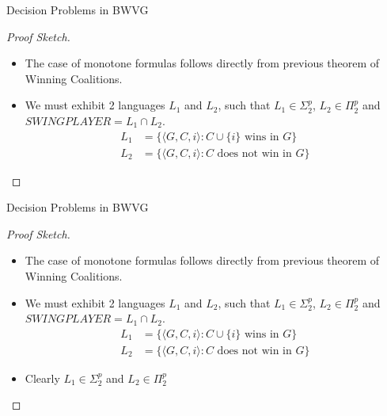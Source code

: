 \documentclass{beamer}
\begin{document}
\begin{frame}[fragile]{Decision Problems in BWVG}
  \begin{proof}[Proof Sketch]
    \begin{itemize}
      \item The case of monotone formulas follows directly from previous theorem of Winning Coalitions.
      \item We must exhibit 2 languages $L_1$ and $L_2$, such that $L_1 \in \Sigma_2^p$, $L_2 \in \Pi_2^p$ and $SWINGPLAYER = L_1 \cap L_2$.
      \begin{subequations}
        \begin{align}
          L_1 &= \{ \langle G, C, i \rangle : C \cup \{i\} \text{ wins in } G \}\\
          L_2 &= \{ \langle G, C, i \rangle : C \text{ does not win in } G \}
        \end{align}
      \end{subequations}
    \end{itemize}
  \end{proof}
\end{frame}

\begin{frame}[fragile]{Decision Problems in BWVG}
  \begin{proof}[Proof Sketch]
    \begin{itemize}
      \item The case of monotone formulas follows directly from previous theorem of Winning Coalitions.
      \item We must exhibit 2 languages $L_1$ and $L_2$, such that $L_1 \in \Sigma_2^p$, $L_2 \in \Pi_2^p$ and $SWINGPLAYER = L_1 \cap L_2$.
      \begin{subequations}
        \begin{align}
          L_1 &= \{ \langle G, C, i \rangle : C \cup \{i\} \text{ wins in } G \}\\
          L_2 &= \{ \langle G, C, i \rangle : C \text{ does not win in } G \}
        \end{align}
      \end{subequations}
      \item Clearly $L_1 \in \Sigma_2^p$ and $L_2 \in \Pi_2^p$
    \end{itemize}
  \end{proof}
\end{frame}
\end{document}
